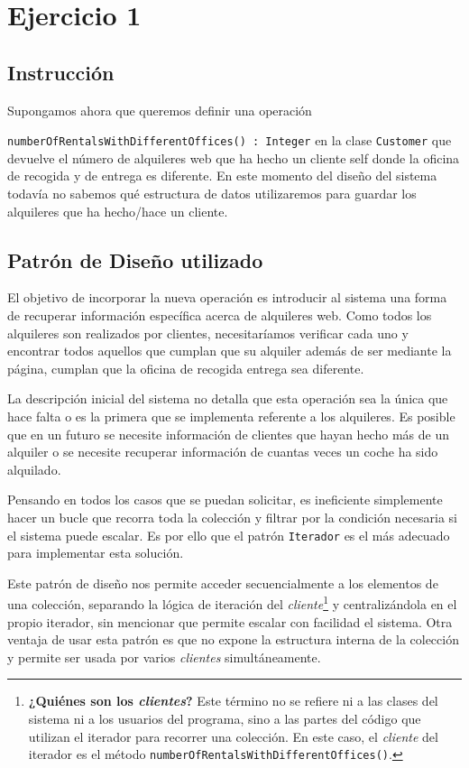 \section{Ejercicio 1}
\subsection*{Instrucción}
Supongamos ahora que queremos definir una operación\par 
\texttt{numberOfRentalsWithDifferentOffices() : Integer} en la clase
\texttt{Customer} que devuelve el número de alquileres web que ha hecho un cliente self donde la oficina de recogida y de
entrega es diferente. En este momento del diseño del sistema todavía no sabemos qué estructura de datos
utilizaremos para guardar los alquileres que ha hecho/hace un cliente.

\subsection{Patrón de Diseño utilizado}
El objetivo de incorporar la nueva operación es introducir al sistema una forma de recuperar información específica acerca de alquileres web. 
Como todos los alquileres son realizados por clientes, necesitaríamos verificar cada uno y encontrar todos aquellos que cumplan que su alquiler 
además de ser mediante la página, cumplan que la oficina de recogida entrega sea diferente.\par
\vspace{0.15cm}
La descripción inicial del sistema no detalla que esta operación sea la única que hace falta o es la primera 
que se implementa referente a los alquileres. Es posible que en un futuro se necesite información de clientes que hayan hecho más de un alquiler 
o se necesite recuperar información de cuantas veces un coche ha sido alquilado.\par
\vspace{0.15cm}
Pensando en todos los casos que se puedan solicitar, es ineficiente simplemente hacer un bucle que recorra toda la colección y filtrar por 
la condición necesaria si el sistema puede escalar. Es por ello que el patrón \texttt{Iterador} es el más adecuado para implementar esta solución.\par
\vspace{0.15cm}
Este patrón de diseño nos permite acceder secuencialmente a los elementos de una colección, separando la lógica de iteración del \emph{cliente}\footnote{\textbf{¿Quiénes son los \emph{clientes}?} Este término no se refiere ni a las clases del sistema ni a los usuarios del programa, sino a las partes del código que utilizan el iterador para recorrer una colección. En este caso, el \emph{cliente} del iterador es el método \texttt{numberOfRentalsWithDifferentOffices()}.} y centralizándola 
en el propio iterador, sin mencionar que permite escalar con facilidad el sistema. Otra ventaja de usar esta patrón es que no expone la estructura interna 
de la colección y permite ser usada por varios \emph{clientes} simultáneamente.

